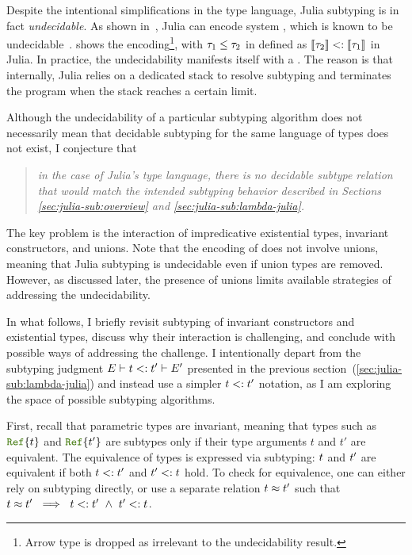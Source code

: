 Despite the intentional simplifications in the type language,
Julia subtyping is in fact \emph{undecidable}.
As shown in~\cite{bib:chung:type-julia-thesis:2023}, Julia can encode system
\FSubN, which is known to be undecidable~\cite{bib:pierce:bound-sub-undec:1992}.
 shows the encoding\footnote{Arrow %
type is dropped as irrelevant to the undecidability result.},
with $\tau_1 \leq \tau_2$ in \FSubN defined as
$\llbracket \tau_2 \rrbracket <: \llbracket \tau_1 \rrbracket$ in Julia.
In practice, the undecidability %
manifests itself with a .
The reason is that internally, Julia relies on a dedicated stack
to resolve subtyping
and terminates the program when the stack reaches a certain limit.

Although the undecidability of a particular subtyping algorithm
does not necessarily mean that decidable subtyping for the same
language of types does not exist, I {conjecture} that
\begin{quotation}\emph{
  in the case of Julia's type language, there is no decidable subtype relation 
  that would match the intended subtyping behavior
  described in Sections \ref{sec:julia-sub:overview} and
  \ref{sec:julia-sub:lambda-julia}.
}\end{quotation}
The key problem is the interaction of
impredicative existential types, invariant constructors, and unions.
Note that the encoding of \FSubN does not involve unions, meaning that Julia
subtyping is undecidable even if union types are removed.
However, as discussed later, the presence of unions limits available strategies
of addressing the undecidability.

In what follows, I briefly revisit subtyping of invariant constructors
and existential types, discuss why their interaction is challenging,
and conclude with possible ways of addressing the challenge.
I intentionally depart from the subtyping judgment
$E \vdash t <: t' \vdash E'$
presented in the previous section~(\ref{sec:julia-sub:lambda-julia})
and instead use a simpler $t <: t'$ notation,
as I am exploring the space of possible subtyping algorithms.

First, recall that parametric types are invariant, meaning that
types such as $\reftyp{t}$ and $\reftyp{t'}$ are subtypes
only if their type arguments $t$ and $t'$ are equivalent.
The equivalence of types is expressed via subtyping:
$t$ and $t'$ are equivalent
if both $t <: t'$ and $t' <: t$ hold.
To check for equivalence, one can either rely on subtyping directly,
or use a separate relation $t \approx t'$ such that 
$\t \approx \t' \ \implies\ \t <: \t'\ \land\ \t' <: \t$.

